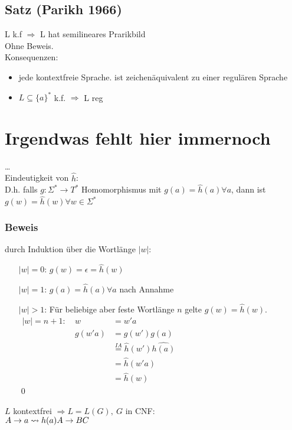 	\subsection{Satz (Parikh 1966)}
	L k.f $\Rightarrow$ L hat semilineares Prarikbild\\
	Ohne Beweis.\\


	Konsequenzen:\\
	\begin{itemize}
		\item jede kontextfreie Sprache. ist zeichenäquivalent zu einer regulären Sprache
		\item $L\subseteq\{a\}^*$ k.f. $\Rightarrow$ L reg
	\end{itemize}

\section{Irgendwas fehlt hier immernoch}
    \dots\\
    Eindeutigkeit von $\hat{h}$:\\
    D.h. falls $g:\Sigma^*\rightarrow T^*$ Homomorphismus mit $g(a)=\hat{h}(a)\forall a$, dann ist $g(w)=\hat{h}(w)\forall w\in\Sigma^*$
    \subsubsection{Beweis}
        durch Induktion über die Wortlänge $|w|$:
        \begin{itemize}
            \item[$|w|=0$:] $g(w)=\epsilon=\hat{h}(w)$
            \item[$|w|=1$:] $g(a)=\hat{h}(a)\forall a$ nach Annahme
            \item[$|w|>1$:] Für beliebige aber feste Wortlänge $n$ gelte $g(w)=\hat{h}(w)$.\\
            \begin{math}
            \begin{array}{lrl}
                |w|=n+1:\ & w&=w'a \\
                & g(w'a) &= g(w')g(a)\\
                && \overset{IA}{=} \hat{h}(w')\hat{h(a)}\\
                && = \hat{h}(w'a)\\
                &&=\hat{h}(w)
            \end{array}
            \end{math}\\\hfill\qed
        \end{itemize}
    $L$ kontextfrei $\Rightarrow L=L(G),\ G$ in CNF:\\
    $A\rightarrow a\leadsto h(a)\\ A\rightarrow BC$
